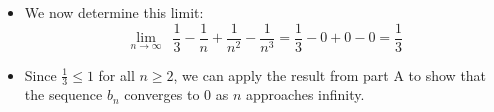 \documentclass[12pt]{report}
\begin{document}
\begin{enumerate}[leftmargin=\labelsep]
\begin{enumerate}
\begin{tcolorbox}
\begin{itemize}[label={}]
                            \item We now determine this limit:
                            \begin{equation*}
                                {\lim_{n \to \infty}}\,\,\, \frac{1}{3} - \frac{1}{n} + \frac{1}{n^2} - \frac{1}{n^3} = \frac{1}{3} - 0 + 0 - 0 = \frac{1}{3}
                            \end{equation*}
                            \item Since $\frac{1}{3} \leq 1$ for all $n \geq 2$, we can apply the result from part A to show that the sequence $b_n$ converges to 0 as $n$ approaches infinity.
                        \end{itemize}
                    \end{tcolorbox}
        \end{enumerate} 


\end{enumerate}
\end{document}
